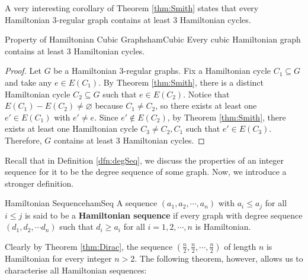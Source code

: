 \documentclass[math, code]{amznotes}
\theoremstyle{remark}
\begin{document}
A very interesting corollary of Theorem \ref{thm:Smith} states that every Hamiltonian $3$-regular graph contains at least $3$ Hamiltonian cycles.
\begin{corbox}{Property of Hamiltonian Cubic Graphs}{hamCubic}
    Every cubic Hamiltonian graph contains at least $3$ Hamiltonian cycles.
    \tcblower
    \begin{proof}
        Let $G$ be a Hamiltonian $3$-regular graphs. Fix a Hamiltonian cycle $C_1 \subseteq G$ and take any $e \in E(C_1)$. By Theorem \ref{thm:Smith}, there is a distinct Hamiltonian cycle $C_2 \subseteq G$ such that $e \in E(C_2)$. Notice that $E(C_1) - E(C_2) \neq \varnothing$ because $C_1 \neq C_2$, so there exists at least one $e' \in E(C_1)$ with $e' \neq e$. Since $e' \notin E(C_2)$, by Theorem \ref{thm:Smith}, there exists at least one Hamiltonian cycle $C_3 \neq C_2, C_1$ such that $e' \in E(C_3)$. Therefore, $G$ contains at least $3$ Hamiltonian cycles.
    \end{proof}
\end{corbox}
Recall that in Definition \ref{dfn:degSeq}, we discuss the properties of an integer sequence for it to be the degree sequence of some graph. Now, we introduce a stronger definition.
\begin{dfnbox}{Hamiltonian Sequence}{hamSeq}
    A sequence $(a_1, a_2, \cdots, a_n)$ with $a_i \leq a_j$ for all $i \leq j$ is said to be a {\color{red} \textbf{Hamiltonian sequence}} if every graph with degree sequence $(d_1, d_2, \cdots d_n)$ such that $d_i \geq a_i$ for all $i = 1, 2, \cdots, n$ is Hamiltonian.
\end{dfnbox}
Clearly by Theorem \ref{thm:Dirac}, the sequence $\left(\frac{n}{2}, \frac{n}{2}, \cdots, \frac{n}{2}\right)$ of length $n$ is Hamiltonian for every integer $n > 2$. The following theorem, however, allows us to characterise all Hamiltonian sequences:
\end{document}
